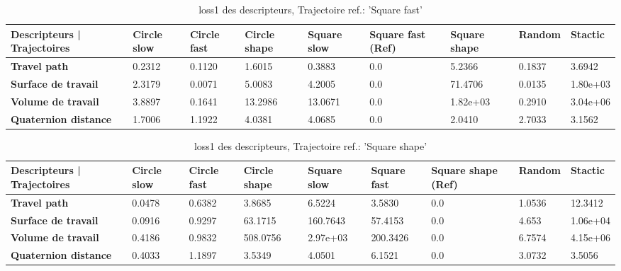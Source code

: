\documentclass[5pt]{article}
\begin{document}
\begin{table}[H]
    \centering
    \begin{tabularx}{\textwidth}{|p{}|X|X|X|X|X|X|X|X|}
    \rowcolor{lightgray}
        \hline
        Descripteurs | Trajectoires &  Circle slow & Circle fast  &  Circle shape  & Square slow & \cellcolor[HTML]{238CCC} \textbf{Square fast (Ref)} & Square shape & Random & Stactic \\ \hline
        \textbf{Travel path} & 0.2312 & 0.1120 & 1.6015 & 0.3883 & 0.0 & 5.2366 & 0.1837 & 3.6942 \\ \hline
        \textbf{Surface de travail} & 2.3179 & 0.0071 & 5.0083 & 4.2005 & 0.0 & 71.4706 & 0.0135 & 1.80e+03 \\ \hline
        \textbf{Volume de travail} & 3.8897 & 0.1641 & 13.2986 & 13.0671 & 0.0 & 1.82e+03 & 0.2910 & 3.04e+06 \\ \hline
        \textbf{Quaternion distance} & 1.7006 & 1.1922 & 4.0381 & 4.0685 & 0.0 & 2.0410 & 2.7033 & 3.1562 \\ \hline  
    \end{tabularx}
    \caption{loss1 des descripteurs, Trajectoire ref.: 'Square fast'}
\end{table}

\begin{table}[H]
    \centering
    \begin{tabularx}{\textwidth}{|p{}|X|X|X|X|X|X|X|X|}
    \rowcolor{lightgray}
        \hline
        Descripteurs | Trajectoires &  Circle slow & Circle fast  &  Circle shape  & Square slow & Square fast & \cellcolor[HTML]{238CCC} \textbf{Square shape (Ref)} & Random & Stactic \\ \hline
        \textbf{Travel path} & 0.0478 & 0.6382 & 3.8685 & 6.5224 & 3.5830 & 0.0 & 1.0536 & 12.3412 \\ \hline
        \textbf{Surface de travail} & 0.0916 & 0.9297 & 63.1715 & 160.7643 & 57.4153 & 0.0 & 4.653 & 1.06e+04 \\ \hline
        \textbf{Volume de travail} & 0.4186 & 0.9832 & 508.0756 & 2.97e+03 & 200.3426 & 0.0 & 6.7574 & 4.15e+06 \\ \hline
        \textbf{Quaternion distance} & 0.4033 & 1.1897 & 3.5349 & 4.0501 & 6.1521 & 0.0 & 3.0732 & 3.5056 \\ \hline  
    \end{tabularx}
    \caption{loss1 des descripteurs, Trajectoire ref.: 'Square shape'}
\end{table}
\end{document}
